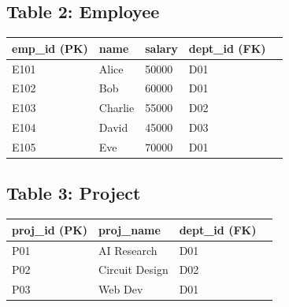 \documentclass[12pt,a4paper]{article}
\begin{document}
\subsection*{Table 2: Employee}
\begin{table}[H]
\centering
\begin{tabular}{@{}llllc@{}}
\toprule
\textbf{emp\_id} (PK) & \textbf{name} & \textbf{salary} & \textbf{dept\_id} (FK) \\ \midrule
E101 & Alice & 50000 & D01 \\
E102 & Bob & 60000 & D01 \\
E103 & Charlie & 55000 & D02 \\
E104 & David & 45000 & D03 \\
E105 & Eve & 70000 & D01 \\ \bottomrule
\end{tabular}
\end{table}

\subsection*{Table 3: Project}
\begin{table}[H]
\centering
\begin{tabular}{@{}lllc@{}}
\toprule
\textbf{proj\_id} (PK) & \textbf{proj\_name} & \textbf{dept\_id} (FK) \\ \midrule
P01 & AI Research & D01 \\
P02 & Circuit Design & D02 \\
P03 & Web Dev & D01 \\ \bottomrule
\end{tabular}
\end{table}
\end{document}
